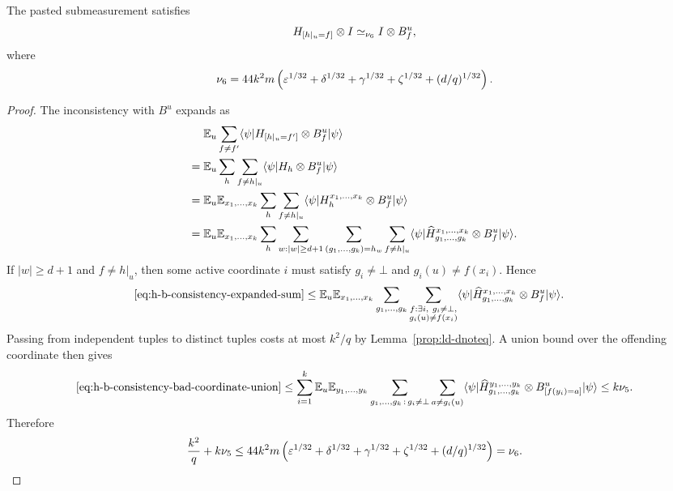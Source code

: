 \begin{lemma}\label{lem:h-b-consistency}
	\leanok
	The pasted submeasurement satisfies
	\[
		H_{[h|_u=f]} \otimes I \simeq_{\nu_6} I \otimes B_f^u,
	\]
	where
	\[
		\nu_6 = 44k^2m\left(\varepsilon^{1/32}+\delta^{1/32}+\gamma^{1/32}+\zeta^{1/32}+(d/q)^{1/32}\right).
	\]
\end{lemma}
\begin{proof}
	\leanok
	The inconsistency with $B^u$ expands as
	\begin{align}
		    & \mathbb{E}_u \sum_{f\ne f'} \langle \psi \rvert H_{[h|_u=f']} \otimes B_f^u \lvert \psi \rangle\nonumber                                   \\
		={} & \mathbb{E}_u \sum_h \sum_{f\ne h|_u} \langle \psi \rvert H_h \otimes B_f^u \lvert \psi \rangle\nonumber                                    \\
		={} & \mathbb{E}_u \mathbb{E}_{x_1,\dots,x_k} \sum_h \sum_{f\ne h|_u} \langle \psi \rvert H_h^{x_1,\dots,x_k} \otimes B_f^u \lvert \psi \rangle\nonumber \\
		={} & \mathbb{E}_u \mathbb{E}_{x_1,\dots,x_k} \sum_h \sum_{w:|w|\ge d+1} \sum_{(g_1,\dots,g_k)=h_w}
		\sum_{f\ne h|_u}
		\langle \psi \rvert \widehat H_{g_1,\dots,g_k}^{x_1,\dots,x_k} \otimes B_f^u \lvert \psi \rangle.
		\label{eq:h-b-consistency-expanded-sum}
	\end{align}
	If $|w|\ge d+1$ and $f \ne h|_u$, then some active coordinate $i$ must satisfy $g_i \ne \bot$ and $g_i(u)\ne f(x_i)$. Hence
	\begin{align}
		\eqref{eq:h-b-consistency-expanded-sum}
		\le{} &
		\mathbb{E}_u \mathbb{E}_{x_1,\dots,x_k} \sum_{g_1,\dots,g_k}
		\sum_{\substack{f:\exists i,\ g_i\ne\bot, \\ g_i(u)\ne f(x_i)}}
		\langle \psi \rvert \widehat H_{g_1,\dots,g_k}^{x_1,\dots,x_k} \otimes B_f^u \lvert \psi \rangle.
		\label{eq:h-b-consistency-bad-coordinate-union}
	\end{align}
	Passing from independent tuples to distinct tuples costs at most $k^2/q$ by Lemma~\ref{prop:ld-dnoteq}. A union bound over the offending coordinate then gives
	\[
		\eqref{eq:h-b-consistency-bad-coordinate-union}
		\le
		\sum_{i=1}^k
		\mathbb{E}_u \mathbb{E}_{y_1,\dots,y_k}
		\sum_{g_1,\dots,g_k\,:\,g_i\ne\bot}
		\sum_{a\ne g_i(u)}
		\langle \psi \rvert \widehat H_{g_1,\dots,g_k}^{y_1,\dots,y_k} \otimes B_{[f(y_i)=a]}^u \lvert \psi \rangle
		\le k\nu_5.
	\]
	Therefore
	\[
		\frac{k^2}{q} + k\nu_5
		\le
		44k^2m\left(\varepsilon^{1/32}+\delta^{1/32}+\gamma^{1/32}+\zeta^{1/32}+(d/q)^{1/32}\right)
		= \nu_6.
	\]
\end{proof}

